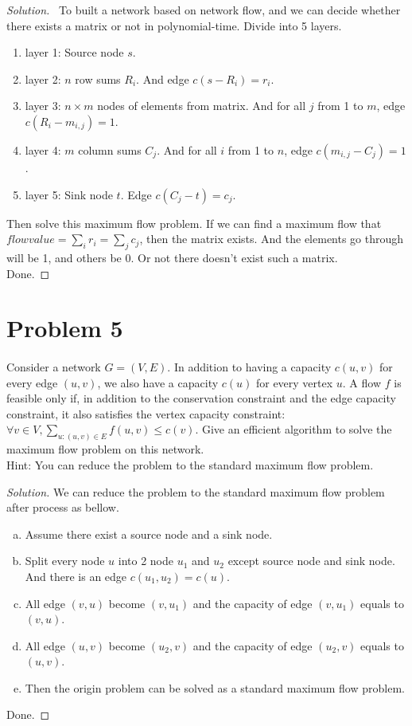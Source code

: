 \documentclass[a4paper]{article}
\newenvironment{solution}
  {\renewcommand\qedsymbol{$\blacksquare$}\begin{proof}[Solution]}
  {\end{proof}}
\begin{document}
\begin{solution}\ To built a network based on network flow, and we can decide whether there exists a matrix or not in polynomial-time. Divide into 5 layers.
  \begin{enumerate}[1)]
    \item layer 1: Source node $s$.
    \item layer 2: $n$ row sums $R_{i}$. And edge $c(s-R_{i})=r_{i}$.
    \item layer 3: $n\times m$ nodes of elements from matrix. And for all $j$ from 1 to $m$, edge $c(R_{i}-m_{i,j})=1$.
    \item layer 4: $m$ column sums $C_{j}$. And for all $i$ from 1 to $n$, edge $c(m_{i,j}-C_{j})=1$.
    \item layer 5: Sink node $t$. Edge $c(C_{j}-t)=c_{j}$.
  \end{enumerate}
  Then solve this maximum flow problem. If we can find a maximum flow that $flow value=\sum_{i}r_{i}=\sum_{j}c_{j}$, then the matrix exists. And the elements go through will be 1, and others be 0. Or not there doesn't exist such a matrix.\\
  Done.
\end{solution}

\section*{Problem 5}
\paragraph{}
Consider a network $G = (V, E)$. In addition to having a capacity $c(u, v)$ for every edge $(u, v)$, we also have
a capacity $c(u)$ for every vertex $u$. A flow $f$ is feasible only if, in addition to the conservation constraint and
the edge capacity constraint, it also satisfies the vertex capacity constraint: $\forall v \in V, \sum_{u:(u,v)\in E}f(u,v)\le c(v)$.
Give an efficient algorithm to solve the maximum flow problem on this network.\\
Hint: You can reduce the problem to the standard maximum flow problem.
\begin{solution}We can reduce the problem to the standard maximum flow problem after process as bellow.
  \begin{enumerate}[(a)]
    \item Assume there exist a source node and a sink node.
    \item Split every node $u$ into 2 node $u_{1}$ and $u_{2}$ except source node and sink node. And there is an edge $c(u_{1},u_{2})=c(u)$.
    \item All edge $(v,u)$ become $(v,u_{1})$ and the capacity of edge $(v,u_{1})$ equals to $(v,u)$.
    \item All edge $(u,v)$ become $(u_{2},v)$ and the capacity of edge $(u_{2},v)$ equals to $(u,v)$.
    \item Then the origin problem can be solved as a standard maximum flow problem.
  \end{enumerate}
  Done.
\end{solution}
\end{document}
